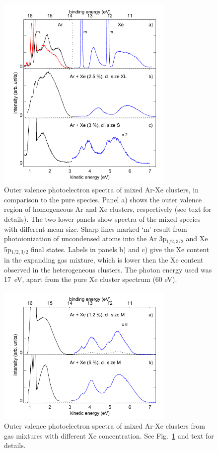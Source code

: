 \begin{figure}[ht]
 \centering
 \includegraphics[width=8.5cm]{pics/figure_oval_1.pdf}
 \caption{
Outer valence photoelectron spectra of mixed Ar-Xe clusters, in comparison to the pure species. Panel a) shows the outer valence region of homogeneous Ar and Xe clusters, respectively (see text for details). The two lower panels show spectra of the mixed species with different mean size. Sharp lines marked `m' result from photoionization of uncondensed atoms into the Ar 3p$_{1/2,3/2}$ and Xe 5p$_{1/2,3/2}$ final states. Labels in panels b) and c) give the Xe content in the expanding gas mixture, which is lower then the Xe content observed in the heterogeneous clusters. The photon energy used was 17~eV, apart from the pure Xe cluster spectrum (60 eV).
}
 \label{figure:oval1}
\end{figure}


\begin{figure}[ht]
 \centering
 \includegraphics[width=8.5cm]{pics/figure_oval_2.pdf}
 \caption{
Outer valence photoelectron spectra of mixed Ar-Xe clusters from gas mixtures with different Xe concentration. See Fig.\ \ref{figure:oval1} and text for details.
}
 \label{figure:oval2}
\end{figure}

